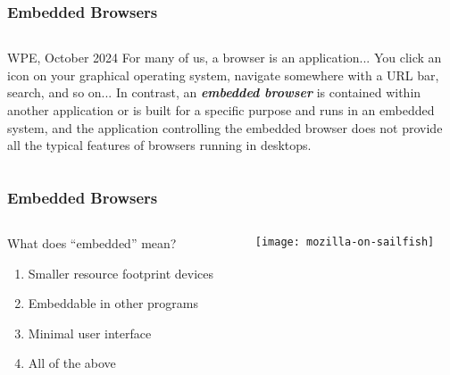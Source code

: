 \documentclass[
	notes=none,
	aspectratio=169
]{beamer}
\begin{document}
\begin{frame}
\frametitle{Embedded Browsers}

\begin{columns}[T]
\begin{column}[T]{1.0\textwidth}
\setlength{\parskip}{0.5em}

\vspace{0.5cm}

\begin{shadequote}[r]{WPE, October 2024}
For many of us, a browser is an application... You click an icon on your graphical operating system, navigate somewhere with a URL bar, search, and so on... In contrast, an \textbf{\textit{embedded browser}} is contained within another application or is built for a specific purpose and runs in an embedded system, and the application controlling the embedded browser does not provide all the typical features of browsers running in desktops.
\end{shadequote}

\end{column}
\end{columns}

\end{frame}


\begin{frame}
\frametitle{Embedded Browsers}

\begin{columns}[T]
\begin{column}[T]{0.55\textwidth}
\setlength{\parskip}{0.5em}

\vspace{1.5cm}
What does ``embedded'' mean?
\begin{enumerate}
\setlength{\parskip}{0.5em}
\item Smaller resource footprint devices
\item Embeddable in other programs
\item Minimal user interface
\item All of the above
\end{enumerate}

\end{column}
\begin{column}[T]{0.37\textwidth}
\setlength{\parskip}{0.5em}

\vspace{1.0cm}
\texttt{[image: mozilla-on-sailfish]}

\end{column}
\end{columns}

\end{frame}
\note{
}
\end{document}
